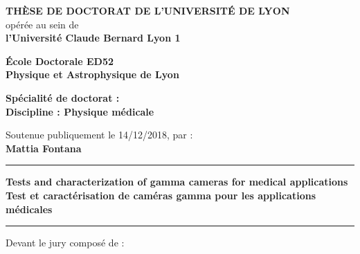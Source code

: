 \begin{center}
\fontsize{14pt}{16pt}\selectfont
\textbf{\uppercase{Th\`{e}se de doctorat de l'universit\'{e} de Lyon}}\\
\fontsize{12pt}{14pt}\selectfont
op\'{e}r\'{e}e au sein de\\
\textbf{l'Universit\'{e} Claude Bernard Lyon 1}

\vspace{0.5cm}

\textbf{\'{E}cole Doctorale ED52\\%
Physique et Astrophysique de Lyon}%

\vspace{0.5cm}

\textbf{Sp\'{e}cialit\'{e} de doctorat :\\
Discipline : Physique m\'{e}dicale} %


\vspace{1.5cm}

Soutenue publiquement le 14/12/2018, par :\\
\fontsize{14pt}{16pt}\selectfont
\textbf{Mattia Fontana}

\vspace{1.5cm} %

\rule[20pt]{\textwidth}{0.5pt}

\fontsize{25pt}{28pt}\selectfont
\textbf{Tests and characterization of gamma cameras for medical applications}\\
\vspace{0.5cm}
\fontsize{20pt}{23pt}\selectfont
\textbf{Test et caract\'{e}risation de cam\'{e}ras gamma pour les applications m\'{e}dicales}

\rule{\textwidth}{0.5pt}

\vspace{2cm} %
\end{center}

\fontsize{12pt}{14pt}\selectfont
Devant le jury compos\'{e} de :
\bigskip

\fontsize{11pt}{13pt}\selectfont


\bigskip

